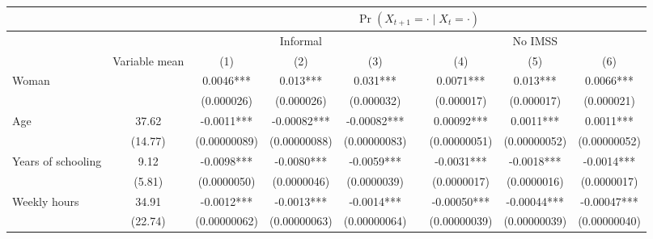 \begin{tabular}{lclllrlll}
\toprule
      &       & \multicolumn{7}{c}{$\Pr(X_{t+1} = \cdot \;|\; X_{t} = \cdot)$} \\
\midrule
      &       & \multicolumn{3}{c}{Informal  } &       & \multicolumn{3}{c}{No IMSS} \\
\cmidrule{3-5}\cmidrule{7-9}      & Variable mean & \multicolumn{1}{c}{(1)} & \multicolumn{1}{c}{(2)} & \multicolumn{1}{c}{(3)} &       & \multicolumn{1}{c}{(4)} & \multicolumn{1}{c}{(5)} & \multicolumn{1}{c}{(6)} \\
\midrule
\midrule
Woman &       & \multicolumn{1}{c}{0.0046***} & \multicolumn{1}{c}{0.013***} & \multicolumn{1}{c}{0.031***} &       & \multicolumn{1}{c}{0.0071***} & \multicolumn{1}{c}{0.013***} & \multicolumn{1}{c}{0.0066***} \\
      &       & \multicolumn{1}{c}{(0.000026)} & \multicolumn{1}{c}{(0.000026)} & \multicolumn{1}{c}{(0.000032)} &       & \multicolumn{1}{c}{(0.000017)} & \multicolumn{1}{c}{(0.000017)} & \multicolumn{1}{c}{(0.000021)} \\
Age   & 37.62 & \multicolumn{1}{c}{-0.0011***} & \multicolumn{1}{c}{-0.00082***} & \multicolumn{1}{c}{-0.00082***} &       & \multicolumn{1}{c}{0.00092***} & \multicolumn{1}{c}{0.0011***} & \multicolumn{1}{c}{0.0011***} \\
      & (14.77) & \multicolumn{1}{c}{(0.00000089)} & \multicolumn{1}{c}{(0.00000088)} & \multicolumn{1}{c}{(0.00000083)} &       & \multicolumn{1}{c}{(0.00000051)} & \multicolumn{1}{c}{(0.00000052)} & \multicolumn{1}{c}{(0.00000052)} \\
Years of schooling & 9.12  & \multicolumn{1}{c}{-0.0098***} & \multicolumn{1}{c}{-0.0080***} & \multicolumn{1}{c}{-0.0059***} &       & \multicolumn{1}{c}{-0.0031***} & \multicolumn{1}{c}{-0.0018***} & \multicolumn{1}{c}{-0.0014***} \\
      & (5.81) & \multicolumn{1}{c}{(0.0000050)} & \multicolumn{1}{c}{(0.0000046)} & \multicolumn{1}{c}{(0.0000039)} &       & \multicolumn{1}{c}{(0.0000017)} & \multicolumn{1}{c}{(0.0000016)} & \multicolumn{1}{c}{(0.0000017)} \\
Weekly hours & 34.91 & \multicolumn{1}{c}{-0.0012***} & \multicolumn{1}{c}{-0.0013***} & \multicolumn{1}{c}{-0.0014***} &       & \multicolumn{1}{c}{-0.00050***} & \multicolumn{1}{c}{-0.00044***} & \multicolumn{1}{c}{-0.00047***} \\
      & (22.74) & \multicolumn{1}{c}{(0.00000062)} & \multicolumn{1}{c}{(0.00000063)} & \multicolumn{1}{c}{(0.00000064)} &       & \multicolumn{1}{c}{(0.00000039)} & \multicolumn{1}{c}{(0.00000039)} & \multicolumn{1}{c}{(0.00000040)} \\

\end{tabular}
